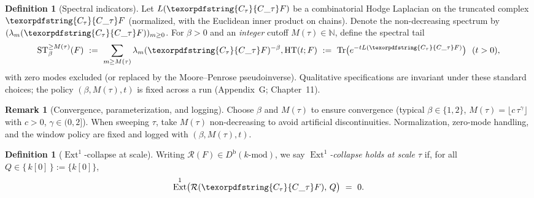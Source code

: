 \documentclass[11pt]{article}
\numberwithin{equation}{section}
\theoremstyle{plain}
\theoremstyle{definition}
\theoremstyle{remark}
\DeclareMathOperator{\Ext}{Ext}
\DeclareRobustCommand{\hyp}{\nobreakdash-}
\newcommand{\Rfun}{\mathcal{R}}
\theoremstyle{plain}
\theoremstyle{definition}
\numberwithin{equation}{section}
\theoremstyle{definition}
\newtheorem{definition}[theorem]{Definition}
\newtheorem{remark}[theorem]{Remark}
\DeclareRobustCommand{\Ctau}{\texorpdfstring{\ensuremath{C_{\tau}}}{C\_\tau}}
\DeclareRobustCommand{\Qtest}{\{\,k[0]\,\}}
\numberwithin{equation}{section}
\theoremstyle{plain}
\theoremstyle{definition}
\theoremstyle{remark}
\providecommand{\Cfun}[1]{\mathsf{C}_{#1}}
\providecommand{\Ctau}{\Cfun{\tau}}
\providecommand{\n}{\unskip\space}
\begin{document}
\begin{definition}[Spectral indicators]\label{def:spectral}
Let \(L(\Ctau F)\) be a combinatorial Hodge Laplacian on the truncated complex \(\Ctau F\) (normalized, with the Euclidean inner product on chains). Denote the non\hyp decreasing spectrum by \((\lambda_m(\Ctau F))_{m\ge 0}\). For \(\beta>0\) and an \emph{integer} cutoff \(M(\tau)\in\mathbb{N}\), define the spectral tail
\[
  \mathrm{ST}_{\beta}^{\ge M(\tau)}(F)\ :=\ \sum_{m\ge M(\tau)} \lambda_m(\Ctau F)^{-\beta},\qquad\n  \mathrm{HT}(t;F)\ :=\ \mathrm{Tr}\big(e^{-tL(\Ctau F)}\big)\ \ (t>0),
\]
with zero modes excluded (or replaced by the Moore–Penrose pseudoinverse). Qualitative specifications are invariant under these standard choices; the policy \((\beta,M(\tau),t)\) is fixed across a run (Appendix~G; Chapter~11).
\end{definition}

\begin{remark}[Convergence, parameterization, and logging]\label{rk:ST-conv}
Choose \(\beta\) and \(M(\tau)\) to ensure convergence (typical \(\beta\in\{1,2\}\), \(M(\tau)=\lfloor c\,\tau^{\gamma}\rfloor\) with \(c>0\), \(\gamma\in(0,2]\)).
When sweeping \(\tau\), take \(M(\tau)\) non\hyp decreasing to avoid artificial discontinuities.
Normalization, zero\hyp mode handling, and the window policy are fixed and logged with \((\beta,M(\tau),t)\).
\end{remark}

\begin{definition}[\(\Ext^1\)\hyp collapse at scale]\label{def:ext-collapse}
Writing \(\Rfun(F)\in D^{\mathrm{b}}(k\text{-mod})\), we say \emph{\(\Ext^1\)\hyp collapse holds at scale \(\tau\)} if, for all \(Q\in\Qtest:=\{k[0]\}\),
\[
  \Ext^1\!\big(\Rfun(\Ctau F),\, Q\big)\ =\ 0.
\]
\end{definition}
\end{document}
